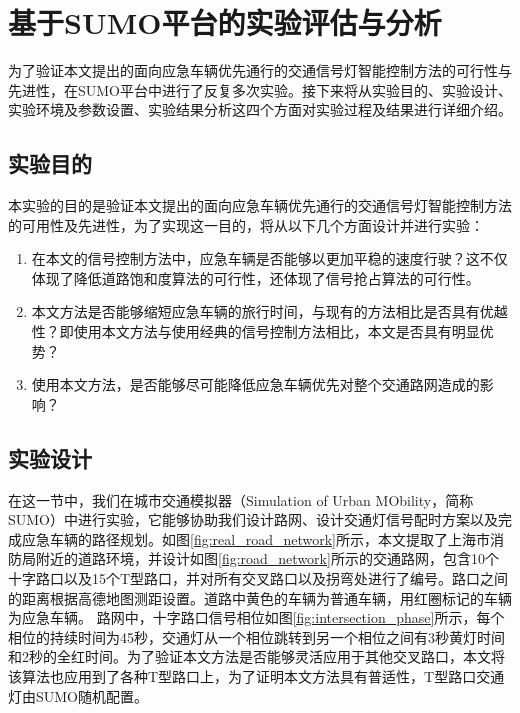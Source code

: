 \chapter{基于SUMO平台的实验评估与分析}
\label{ch5}

为了验证本文提出的面向应急车辆优先通行的交通信号灯智能控制方法的可行性与先进性，在SUMO平台中进行了反复多次实验。接下来将从实验目的、实验设计、实验环境及参数设置、实验结果分析这四个方面对实验过程及结果进行详细介绍。

\section{实验目的}
本实验的目的是验证本文提出的面向应急车辆优先通行的交通信号灯智能控制方法的可用性及先进性，为了实现这一目的，将从以下几个方面设计并进行实验：

\begin{enumerate}
	\item 在本文的信号控制方法中，应急车辆是否能够以更加平稳的速度行驶？这不仅体现了降低道路饱和度算法的可行性，还体现了信号抢占算法的可行性。
	\item 本文方法是否能够缩短应急车辆的旅行时间，与现有的方法相比是否具有优越性？即使用本文方法与使用经典的信号控制方法相比，本文是否具有明显优势？
	\item 使用本文方法，是否能够尽可能降低应急车辆优先对整个交通路网造成的影响？
\end{enumerate}

\section{实验设计}
在这一节中，我们在城市交通模拟器（Simulation of Urban MObility，简称SUMO）中进行实验，它能够协助我们设计路网、设计交通灯信号配时方案以及完成应急车辆的路径规划。如图\ref{fig:real_road_network}所示，本文提取了上海市消防局附近的道路环境，并设计如图\ref{fig:road_network}所示的交通路网，包含10个十字路口以及15个T型路口，并对所有交叉路口以及拐弯处进行了编号。路口之间的距离根据高德地图测距设置。道路中黄色的车辆为普通车辆，用红圈标记的车辆为应急车辆。 路网中，十字路口信号相位如图\ref{fig:intersection_phase}所示，每个相位的持续时间为45秒，交通灯从一个相位跳转到另一个相位之间有3秒黄灯时间和2秒的全红时间。为了验证本文方法是否能够灵活应用于其他交叉路口，本文将该算法也应用到了各种T型路口上，为了证明本文方法具有普适性，T型路口交通灯由SUMO随机配置。

